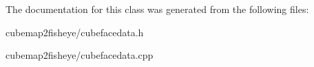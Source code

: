 \-The documentation for this class was generated from the following files\-:\begin{DoxyCompactItemize}
\item 
cubemap2fisheye/cubefacedata.\-h\item 
cubemap2fisheye/cubefacedata.\-cpp\end{DoxyCompactItemize}
